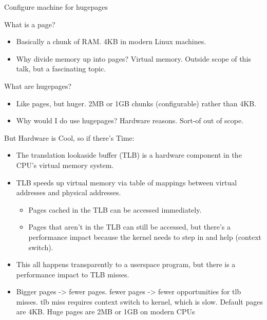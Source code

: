 \documentclass[presentation]{beamer}
\begin{document}
\begin{frame}[label={sec:org61cef06}]{Configure machine for hugepages}
\begin{block}{What is a page?}
\begin{itemize}
\item Basically a chunk of RAM. 4KB in modern Linux machines.
\item Why divide memory up into pages? Virtual memory. Outside scope of this talk, but a fascinating topic.
\end{itemize}
\end{block}
\begin{block}{What are hugepages?}
\begin{itemize}
\item Like pages, but huger. 2MB or 1GB chunks (configurable) rather than 4KB.
\item Why would I do use hugepages? Hardware reasons. Sort-of out of scope.
\end{itemize}
\end{block}
\end{frame}
\begin{frame}[label={sec:orgc11a540}]{But Hardware is Cool, so if there's Time:}
\begin{itemize}
\item The translation lookaside buffer (TLB) is a hardware component in
the CPU's virtual memory system.
\item TLB speeds up virtual memory via table of mappings between virtual addresses and physical addresses.
\begin{itemize}
\item Pages cached in the TLB can be accessed immediately.
\item Pages that aren't in the TLB can still be accessed, but there's
a performance impact because the kernel needs to step in and
help (context switch).
\end{itemize}
\item This all happens transparently to a userspace program, but there
is a performance impact to TLB misses.
\item Bigger pages -> fewer pages. fewer pages -> fewer opportunities
for tlb misses. tlb miss requires context switch to kernel, which
is slow. Default pages are 4KB. Huge pages are 2MB or 1GB on
modern CPUs
\end{itemize}
\end{frame}
\end{document}
